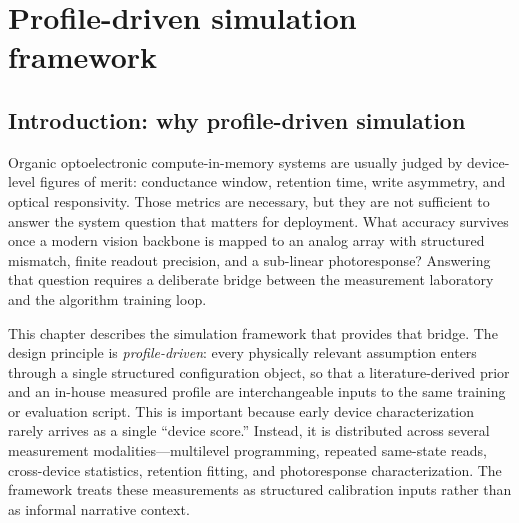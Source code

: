%
%

\chapter{Profile-driven simulation framework}
\label{chap:framework}

\section{Introduction: why profile-driven simulation}

Organic optoelectronic compute-in-memory systems are usually judged by device-level figures of merit: conductance window, retention time, write asymmetry, and optical responsivity. Those metrics are necessary, but they are not sufficient to answer the system question that matters for deployment. What accuracy survives once a modern vision backbone is mapped to an analog array with structured mismatch, finite readout precision, and a sub-linear photoresponse? Answering that question requires a deliberate bridge between the measurement laboratory and the algorithm training loop.

This chapter describes the simulation framework that provides that bridge. The design principle is \emph{profile-driven}: every physically relevant assumption enters through a single structured configuration object, so that a literature-derived prior and an in-house measured profile are interchangeable inputs to the same training or evaluation script. This is important because early device characterization rarely arrives as a single ``device score.'' Instead, it is distributed across several measurement modalities—multilevel programming, repeated same-state reads, cross-device statistics, retention fitting, and photoresponse characterization. The framework treats these measurements as structured calibration inputs rather than as informal narrative context.

